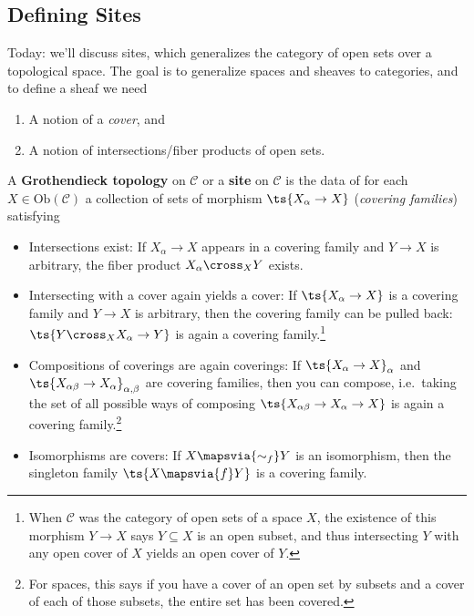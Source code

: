 \hypertarget{defining-sites}{%
\subsection{Defining Sites}\label{defining-sites}}

Today: we'll discuss sites, which generalizes the category of open sets
over a topological space. The goal is to generalize spaces and sheaves
to categories, and to define a sheaf we need

\begin{enumerate}
\def\labelenumi{\arabic{enumi}.}
\item
  A notion of a \emph{cover}, and
\item
  A notion of intersections/fiber products of open sets.
\end{enumerate}

\begin{definition}

A \textbf{Grothendieck topology} on \(\mathcal{C}\) or a \textbf{site}
on \(\mathcal{C}\) is the data of for each
\(X\in \mathrm{Ob}(\mathcal{C})\) a collection of sets of morphism
\(\ts{X_\alpha \to X}\) (\emph{covering families}) satisfying

\begin{itemize}
\item
  Intersections exist: If \(X_\alpha\to X\) appears in a covering family
  and \(Y\to X\) is arbitrary, the fiber product \(X_\alpha\cross_X Y\)
  exists.
\item
  Intersecting with a cover again yields a cover: If
  \(\ts{X_\alpha\to X}\) is a covering family and \(Y\to X\) is
  arbitrary, then the covering family can be pulled back:
  \(\ts{Y\cross_X X_\alpha\to Y}\) is again a covering
  family.\footnote{When \(\mathcal{C}\) was the category of open sets of
    a space \(X\), the existence of this morphism \(Y\to X\) says
    \(Y \subseteq X\) is an open subset, and thus intersecting \(Y\)
    with any open cover of \(X\) yields an open cover of \(Y\).}
\item
  Compositions of coverings are again coverings: If
  \(\ts{X_\alpha\to X}_{\alpha}\) and
  \(\ts{X_{\alpha\beta} \to X_\alpha}_{\alpha,\beta}\) are covering
  families, then you can compose, i.e.~taking the set of all possible
  ways of composing \(\ts{X_{\alpha\beta} \to X_\alpha \to X}\) is again
  a covering family.\footnote{For spaces, this says if you have a cover
    of an open set by subsets and a cover of each of those subsets, the
    entire set has been covered.}
\item
  Isomorphisms are covers: If \(X\mapsvia{\sim_f} Y\) is an isomorphism,
  then the singleton family \(\ts{X\mapsvia{f} Y}\) is a covering
  family.
\end{itemize}

\end{definition}

